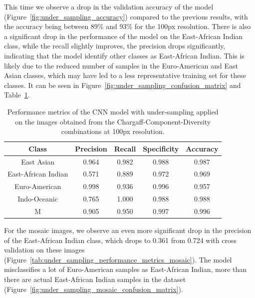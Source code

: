\label{subsubsec:results_under_sampling}

This time we observe a drop in the validation accuracy of the model (Figure~\ref{fig:under_sampling_accuracy}) compared to the previous results,
with the accuracy being between 89\% and 93\% for the 100px resolution. There is also a significant drop in the performance of the model
on the East-African Indian class, while the recall slightly improves, the precision drops significantly, indicating that the model identify
other classes as East-African Indian. This is likely due to the reduced number of samples in the Euro-American and East Asian classes,
which may have led to a less representative training set for these classes. It can be seen in Figure~\ref{fig:under_sampling_confusion_matrix}
and Table~\ref{tab:under_sampling_performance_metrics}.

\begin{table}[H]
	\centering
	\begin{tabular}{|c|c|c|c|c|}
		\hline
		\textbf{Class}      & \textbf{Precision} & \textbf{Recall} & \textbf{Specificity} & \textbf{Accuracy} \\
		\hline
		East Asian          & 0.964              & 0.982           & 0.988                & 0.987             \\
		East-African Indian & 0.571              & 0.889           & 0.972                & 0.969             \\
		Euro-American       & 0.998              & 0.936           & 0.996                & 0.957             \\
		Indo-Oceanic        & 0.765              & 1.000           & 0.988                & 0.988             \\
		M                   & 0.905              & 0.950           & 0.997                & 0.996             \\
		\hline
	\end{tabular}
	\caption{Performance metrics of the CNN model with under-sampling applied on the images obtained from the Chargaff-Component-Diversity
		combinations at 100px resolution.}
	\label{tab:under_sampling_performance_metrics}
\end{table}

For the mosaic images, we observe an even more significant drop in the precision of the East-African Indian class, which drops to 0.361 from
0.724 with cross validation on these images (Figure~\ref{tab:under_sampling_performance_metrics_mosaic}). The model misclassifies a lot of
Euro-American samples as East-African Indian, more than there are actual East-African Indian samples in the dataset
(Figure~\ref{fig:under_sampling_mosaic_confusion_matrix}).

